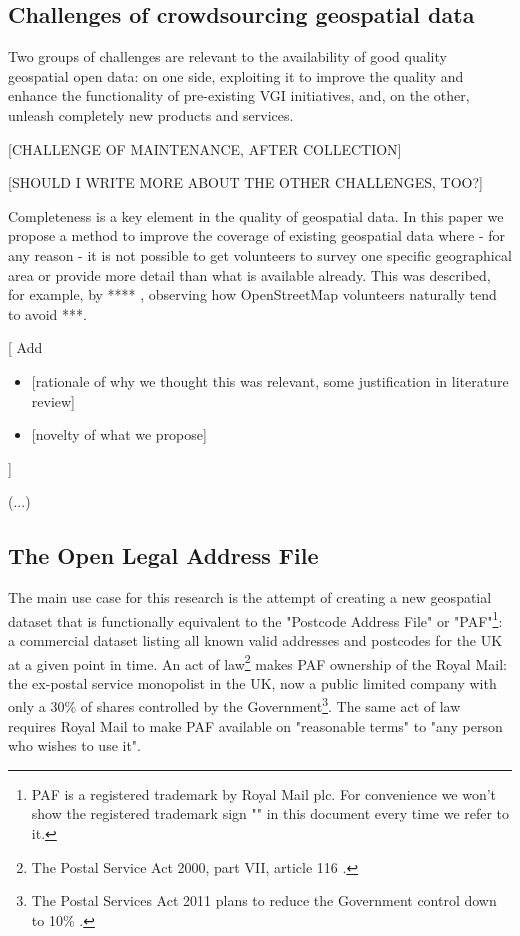 \subsection{Challenges of crowdsourcing geospatial data}

    Two groups of challenges are relevant to the availability of good quality geospatial open data: on one side, exploiting it to improve the quality and enhance the functionality of pre-existing VGI initiatives, and, on the other, unleash completely new products and services.
    
    [CHALLENGE OF MAINTENANCE, AFTER COLLECTION]
    
    [SHOULD I WRITE MORE ABOUT THE OTHER CHALLENGES, TOO?]
    
    Completeness is a key element in the quality of geospatial data. In this paper we propose a method to improve the coverage of existing geospatial data where - for any reason - it is not possible to get volunteers to survey one specific geographical area or provide more detail than what is available already. This was described, for example, by **** , observing how OpenStreetMap volunteers naturally tend to avoid ***.
    
    {[}
    Add
    \begin{itemize}
    	\item {[}rationale of why we thought this was relevant, some justification in literature review{]}
    	\item {[}novelty of what we propose{]}
    \end{itemize}
    {]}
    
    {(}...{)}

\subsection{The Open Legal Address File}

    The main use case for this research is the attempt of creating a new geospatial dataset that is functionally equivalent to the "Postcode Address File" or "PAF"\footnote{PAF is a registered trademark by Royal Mail plc. For convenience we won't show the registered trademark sign "\textregistered" in this document every time we refer to it.}: a commercial dataset listing all known valid addresses and postcodes for the UK at a given point in time. 
    An act of law\footnote{The Postal Service Act 2000, part VII, article 116 \cite{postalserviceact2000}.} makes PAF ownership of the Royal Mail: the ex-postal service monopolist in the UK, now a public limited company with only a 30\% of shares controlled by the Government\footnote{The Postal Services Act 2011 plans to reduce the Government control down to 10\% \cite{postalserviceact2011}.}. The same act of law requires Royal Mail to make PAF available on "reasonable terms" to "any person who wishes to use it".
    
